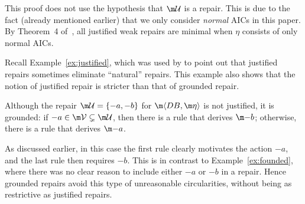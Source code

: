 
This proof does not use the hypothesis that $\UU$ is a repair.
This is due to the fact (already mentioned earlier) that we only consider \emph{normal} AICs in this paper. By Theorem~4 of~\cite{tplp/CaropreseT11}, all justified weak repairs are minimal when $\eta$ consists of only normal AICs.


Recall Example~\ref{ex:justified}, which was used by \citet{tase/Cruz-FilipeGEN13} to point out that justified repairs sometimes eliminate ``natural'' repairs.
This example also shows that the notion of justified repair is stricter than that of grounded repair.
\begin{example}[Example~\ref{ex:justified} continued]
  Although the repair $\UU=\{-a,-b\}$ for $\fulldb$ is not justified, it is grounded: if ${-a}\in\VV\subsetneq\UU$, then there is a rule that derives $\remove b$; otherwise, there is a rule that derives $\remove a$. %
\end{example}
As discussed earlier, in this case the first rule clearly motivates the action $-a$, and the last rule then requires $-b$.
This is in contrast to Example~\ref{ex:founded}, where there was no clear reason to include either $-a$ or $-b$ in a repair.
Hence grounded repairs avoid this type of unreasonable circularities, without being as restrictive as justified repairs.

